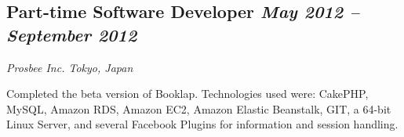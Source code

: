 \subsection*{{\color{special-color}Part-time Software Developer \hfill \textnormal{\emph{May 2012 -- September 2012 }}}}
\begin{description}
  \item[\faSuitcase] \emph{Prosbee Inc. \hfill {\color{gray}Tokyo, Japan}}
  \item Completed the beta version of Booklap. Technologies used were: CakePHP, MySQL, Amazon RDS, Amazon EC2, Amazon Elastic Beanstalk, GIT, a 64-bit Linux Server, and several Facebook Plugins for information and session handling.
\end{description}


